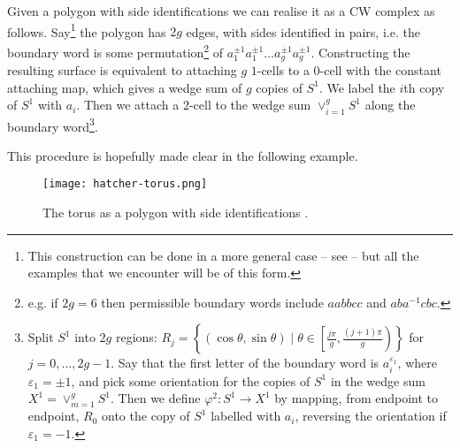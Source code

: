 \documentclass[12pt]{article}
\numberwithin{equation}{subsection}
\numberwithin{theorem}{subsection}
\numberwithin{lemma}{subsection}
\numberwithin{corollary}{subsection}
\numberwithin{definition}{subsection}
\numberwithin{example}{subsection}
\numberwithin{note}{subsection}
\newcommand{\vare}{\varepsilon}
\begin{document}
\begin{appendices}
            Given a polygon with side identifications we can realise it as a CW complex as follows.
            Say\footnote{
                This construction can be done in a more general case -- see \cite[Cell~Complexes,~Chapter~0,~p.~5]{hatcher2002algebraic} -- but all the examples that we encounter will be of this form.
            } the polygon has $2g$ edges, with sides identified in pairs, i.e. the boundary word is some permutation\footnote{
                e.g. if $2g=6$ then permissible boundary words include $aabbcc$ and $aba^{-1}cbc$.
            } of $a_1^{\pm1}a_1^{\pm1}\ldots a_g^{\pm1}a_g^{\pm1}$.
            Constructing the resulting surface is equivalent to attaching $g$ $1$-cells to a $0$-cell with the constant attaching map, which gives a wedge sum of $g$ copies of $S^1$.
            We label the $i$th copy of $S^1$ with $a_i$.
            Then we attach a $2$-cell to the wedge sum $\vee_{i=1}^g S^1$ along the boundary word\footnote{
                Split $S^1$ into $2g$ regions: $R_j=\left\{(\cos\theta,\sin\theta) \mid \theta\in\left[\frac{j\pi}{g},\frac{(j+1)\pi}{g}\right)\right\}$ for $j=0,\ldots,2g-1$.
                Say that the first letter of the boundary word is $a_i^{\vare_1}$, where $\vare_1=\pm1$, and pick some orientation for the copies of $S^1$ in the wedge sum $X^1=\vee_{m=1}^g S^1$.
                Then we define $\varphi^2\colon S^1\to X^1$ by mapping, from endpoint to endpoint, $R_0$ onto the copy of $S^1$ labelled with $a_i$, reversing the orientation if $\vare_1=-1$.
            }.

            \bigskip
            This procedure is hopefully made clear in the following example.

            \begin{figure}[t]
                \centering
                \texttt{[image: hatcher-torus.png]}
                \caption{The torus as a polygon with side identifications \cite[p.~5,~\S0]{hatcher2002algebraic}.}\label{fg:hatcher-torus}
            \end{figure}


\end{appendices}
\end{document}
